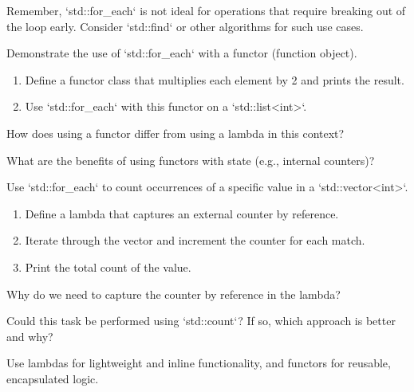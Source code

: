 \begin{challenge}
    \begin{advice}
        Remember, `std::for_each` is not ideal for operations that require breaking out of the loop early. Consider `std::find` or other algorithms for such use cases.
    \end{advice}

    \begin{task}
    Demonstrate the use of `std::for_each` with a functor (function object).
    \begin{enumerate}
        \item Define a functor class that multiplies each element by 2 and prints the result.
        \item Use `std::for_each` with this functor on a `std::list<int>`.
    \end{enumerate}
    \begin{questions}
        \item How does using a functor differ from using a lambda in this context?
        \item What are the benefits of using functors with state (e.g., internal counters)?
    \end{questions}
    \end{task}

    \begin{task}
    Use `std::for_each` to count occurrences of a specific value in a `std::vector<int>`.
    \begin{enumerate}
        \item Define a lambda that captures an external counter by reference.
        \item Iterate through the vector and increment the counter for each match.
        \item Print the total count of the value.
    \end{enumerate}
    \begin{questions}
        \item Why do we need to capture the counter by reference in the lambda?
        \item Could this task be performed using `std::count`? If so, which approach is better and why?
    \end{questions}
    \end{task}

    \begin{advice}
        Use lambdas for lightweight and inline functionality, and functors for reusable, encapsulated logic.
    \end{advice}
\end{challenge}
